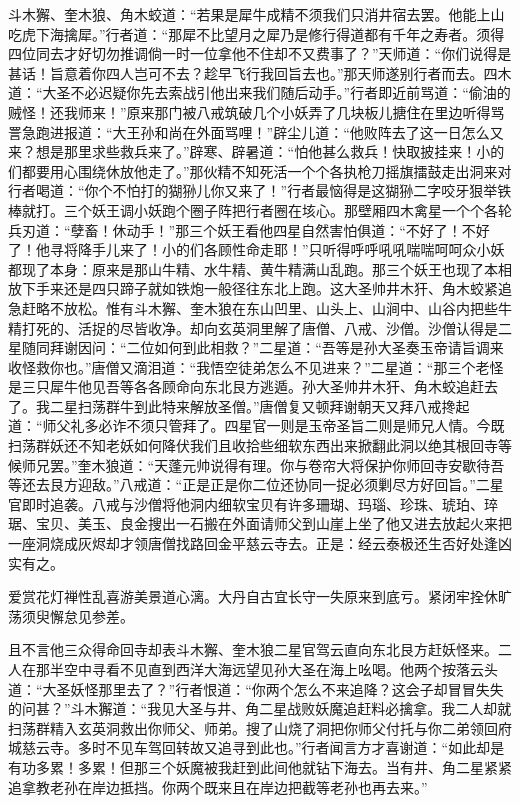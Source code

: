 \documentclass[12pt,UTF8]{ctexbook}
\begin{document}
{	斗木獬、奎木狼、角木蛟道：“若果是犀牛成精不须我们只消井宿去罢。他能上山吃虎下海擒犀。”行者道：“那犀不比望月之犀乃是修行得道都有千年之寿者。须得四位同去才好切勿推调倘一时一位拿他不住却不又费事了？”天师道：“你们说得是甚话！旨意着你四人岂可不去？趁早飞行我回旨去也。”那天师遂别行者而去。四木道：“大圣不必迟疑你先去索战引他出来我们随后动手。”行者即近前骂道：“偷油的贼怪！还我师来！”原来那门被八戒筑破几个小妖弄了几块板儿搪住在里边听得骂詈急跑进报道：“大王孙和尚在外面骂哩！”辟尘儿道：“他败阵去了这一日怎么又来？想是那里求些救兵来了。”辟寒、辟暑道：“怕他甚么救兵！快取披挂来！小的们都要用心围绕休放他走了。”那伙精不知死活一个个各执枪刀摇旗擂鼓走出洞来对行者喝道：“你个不怕打的猢狲儿你又来了！”行者最恼得是这猢狲二字咬牙狠举铁棒就打。三个妖王调小妖跑个圈子阵把行者圈在垓心。那壁厢四木禽星一个个各轮兵刃道：“孽畜！休动手！”那三个妖王看他四星自然害怕俱道：“不好了！不好了！他寻将降手儿来了！小的们各顾性命走耶！”只听得呼呼吼吼喘喘呵呵众小妖都现了本身：原来是那山牛精、水牛精、黄牛精满山乱跑。那三个妖王也现了本相放下手来还是四只蹄子就如铁炮一般径往东北上跑。这大圣帅井木犴、角木蛟紧追急赶略不放松。惟有斗木獬、奎木狼在东山凹里、山头上、山涧中、山谷内把些牛精打死的、活捉的尽皆收净。却向玄英洞里解了唐僧、八戒、沙僧。沙僧认得是二星随同拜谢因问：“二位如何到此相救？”二星道：“吾等是孙大圣奏玉帝请旨调来收怪救你也。”唐僧又滴泪道：“我悟空徒弟怎么不见进来？”二星道：“那三个老怪是三只犀牛他见吾等各各顾命向东北艮方逃遁。孙大圣帅井木犴、角木蛟追赶去了。我二星扫荡群牛到此特来解放圣僧。”唐僧复又顿拜谢朝天又拜八戒搀起道：“师父礼多必诈不须只管拜了。四星官一则是玉帝圣旨二则是师兄人情。今既扫荡群妖还不知老妖如何降伏我们且收拾些细软东西出来掀翻此洞以绝其根回寺等候师兄罢。”奎木狼道：“天蓬元帅说得有理。你与卷帘大将保护你师回寺安歇待吾等还去艮方迎敌。”八戒道：“正是正是你二位还协同一捉必须剿尽方好回旨。”二星官即时追袭。八戒与沙僧将他洞内细软宝贝有许多珊瑚、玛瑙、珍珠、琥珀、琗琚、宝贝、美玉、良金搜出一石搬在外面请师父到山崖上坐了他又进去放起火来把一座洞烧成灰烬却才领唐僧找路回金平慈云寺去。正是：经云泰极还生否好处逢凶实有之。
	
	爱赏花灯禅性乱喜游美景道心漓。大丹自古宜长守一失原来到底亏。紧闭牢拴休旷荡须臾懈怠见参差。
	
	且不言他三众得命回寺却表斗木獬、奎木狼二星官驾云直向东北艮方赶妖怪来。二人在那半空中寻看不见直到西洋大海远望见孙大圣在海上吆喝。他两个按落云头道：“大圣妖怪那里去了？”行者恨道：“你两个怎么不来追降？这会子却冒冒失失的问甚？”斗木獬道：“我见大圣与井、角二星战败妖魔追赶料必擒拿。我二人却就扫荡群精入玄英洞救出你师父、师弟。搜了山烧了洞把你师父付托与你二弟领回府城慈云寺。多时不见车驾回转故又追寻到此也。”行者闻言方才喜谢道：“如此却是有功多累！多累！但那三个妖魔被我赶到此间他就钻下海去。当有井、角二星紧紧追拿教老孙在岸边抵挡。你两个既来且在岸边把截等老孙也再去来。”
	
}
\end{document}
